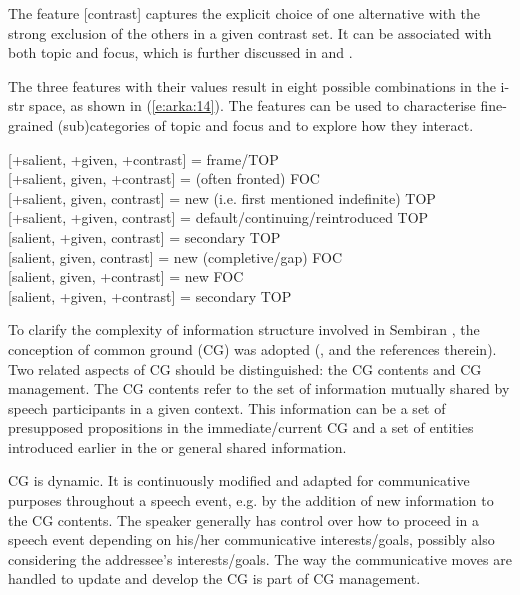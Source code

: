 \documentclass[output=paper
,modfonts
,nonflat]{langsci/langscibook}
\begin{document}
The feature [contrast] captures the explicit choice of one alternative with the strong exclusion of the others in a given contrast set. It can be associated with both topic and focus, which is further discussed in  and . 

  
The three features with their values result in eight possible combinations in the i-str space, as shown in (\ref{e:arka:14}). The features can be used to characterise fine-grained (sub)categories of topic and focus and to explore how they interact. 

  
\begin{exe}
	\label{e:arka:14}	    
	    \ea{} [+salient,   +given,   +contrast]  =   frame/TOP\\
	    \ex{} [+salient,   \textminus given,    +contrast]  =   (often fronted) FOC\\
	    \ex{} [+salient,   \textminus given,    \textminus contrast]  =  new (i.e. first mentioned  indefinite) TOP\\
	    \ex{} [+salient,   +given,   \textminus contrast]  =  default/continuing/reintroduced TOP\\
	    \ex{} [\textminus salient,   +given,   \textminus contrast]  =  secondary TOP\\
	    \ex{} [\textminus salient,   \textminus given,   \textminus contrast]  =  new (completive/gap) FOC\\
	    \ex{} [\textminus salient,   \textminus given,   +contrast]  =   new FOC\\
	    \ex{} [\textminus salient,   +given,   +contrast]  =   secondary TOP
	\z
\end{exe}

\noindent
To clarify the complexity of information structure involved in Sembiran , the conception of common ground (CG) was adopted (\citealt{Krifka2012}, and the references therein). Two related aspects of CG should be distinguished: the CG contents and CG management. The CG contents refer to the set of information mutually shared by speech participants in a given context. This information can be a set of presupposed propositions in the immediate/current CG and a set of entities introduced earlier in the  or general shared information.

CG is dynamic. It is continuously modified and adapted for communicative purposes throughout a speech event, e.g. by the addition of new information to the CG contents. The speaker generally has control over how to proceed in a speech event depending on his/her communicative interests/goals, possibly also considering the addressee’s interests/goals. The way the communicative moves are handled to update and develop the CG is part of CG management. 
\end{document}
